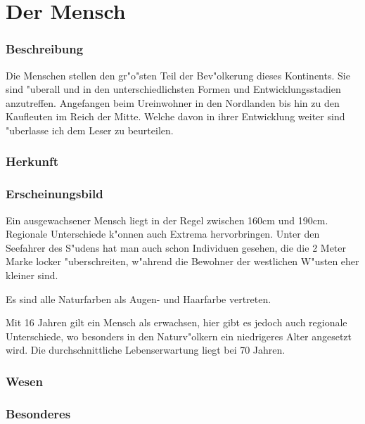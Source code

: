 \section{Der Mensch}
\subsubsection{Beschreibung}
\par Die Menschen stellen den gr"o"sten Teil der Bev"olkerung
dieses Kontinents. Sie sind "uberall und in den unterschiedlichsten
Formen und Entwicklungsstadien anzutreffen. Angefangen beim
Ureinwohner in den Nordlanden bis hin zu den Kaufleuten im Reich der
Mitte. Welche davon in ihrer Entwicklung weiter sind "uberlasse ich
dem Leser zu beurteilen.
\subsubsection{Herkunft}
\subsubsection{Erscheinungsbild}
\par Ein ausgewachsener Mensch liegt in der Regel zwischen 160cm und
190cm. Regionale Unterschiede k"onnen auch Extrema hervorbringen.
Unter den Seefahrer des S"udens hat man auch schon Individuen
gesehen, die die 2 Meter Marke locker "uberschreiten, w"ahrend die
Bewohner der westlichen W"usten eher kleiner sind.
\par Es sind alle Naturfarben als Augen- und Haarfarbe vertreten.
\par Mit 16 Jahren gilt ein Mensch als erwachsen, hier gibt es jedoch
auch regionale Unterschiede, wo besonders in den Naturv"olkern ein
niedrigeres Alter angesetzt wird. Die durchschnittliche
Lebenserwartung liegt bei 70 Jahren.
\subsubsection{Wesen}
\subsubsection{Besonderes}
